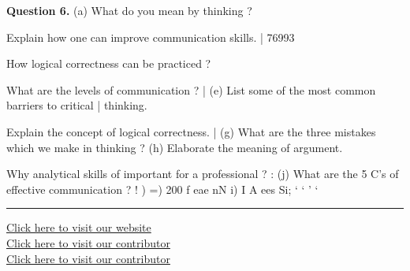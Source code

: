 \documentclass[11pt,a4paper]{article}
\begin{document}
\medskip\noindent\textbf{Question 6.} (a) What do you mean by thinking ?
\begin{parts}
  \item Explain how one can improve communication
  skills.
  | 76993
  \item How logical correctness can be practiced ?
  \item What are the levels of communication ?
  | (e) List some of the most common barriers to critical
  | thinking.
  \item Explain the concept of logical correctness.
  | (g) What are the three mistakes which we make in
  thinking ?
(h) Elaborate the meaning of argument.
  \item Why analytical skills of important for a
  professional ?
  : (j) What are the 5 C's of effective communication ?
  !
  ) =) 200
  f eae nN i) I A ees Si;
  ‘
  ‘
  ' ‘
\end{parts}

\vfill
\rule{\linewidth}{0.4pt}
\begin{center}\small
\href{https://bhu-exam.vercel.app/}{Click here to visit our website}\\[4pt]\href{https://me-aryan.vercel.app/}{Click here to visit our contributor}\\[4pt]\href{https://quashan-me.vercel.app/}{Click here to visit our contributor}
\end{center}
\end{document}
